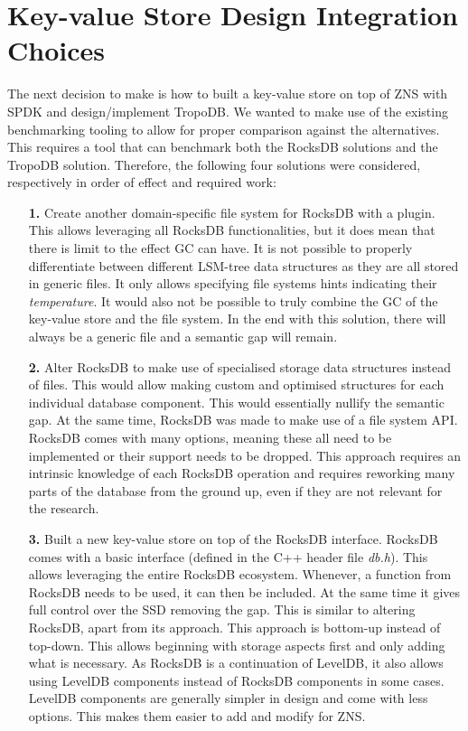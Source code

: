 \section{Key-value Store Design Integration Choices}
The next decision to make is how to built a key-value store on top of ZNS with SPDK and design/implement TropoDB. We wanted to make use of the existing benchmarking tooling to allow for proper comparison against the alternatives. This requires a tool that can benchmark both the RocksDB solutions and the TropoDB solution. Therefore, the following four solutions were considered, respectively in order of effect and required work:
\begin{enumerate}
    \item[\textbf{1.}] Create another domain-specific file system for RocksDB with a plugin. This allows leveraging all RocksDB functionalities, but it does mean that there is limit to the effect GC can have. It is not possible to properly differentiate between different LSM-tree data structures as they are all stored in generic files. It only allows specifying file systems hints indicating their \textit{temperature}. It would also not be possible to truly combine the GC of the key-value store and the file system. In the end with this solution, there will always be a generic file and a semantic gap will remain.  
    \item[\textbf{2.}] Alter RocksDB to make use of specialised storage data structures instead of files. This would allow making custom and optimised structures for each individual database component. This would essentially nullify the semantic gap. At the same time, RocksDB was made to make use of a file system API. RocksDB comes with many options, meaning these all need to be implemented or their support needs to be dropped. This approach requires an intrinsic knowledge of each RocksDB operation and requires reworking many parts of the database from the ground up, even if they are not relevant for the research.
    \item[\textbf{3.}] Built a new key-value store on top of the RocksDB interface. RocksDB comes with a basic interface (defined in the C++ header file \textit{db.h}). This allows leveraging the entire RocksDB ecosystem. Whenever, a function from RocksDB needs to be used, it can then be included. At the same time it gives full control over the SSD removing the gap. This is similar to altering RocksDB, apart from its approach. This approach is bottom-up instead of top-down. This allows beginning with storage aspects first and only adding what is necessary. As RocksDB is a continuation of LevelDB, it also allows using LevelDB components instead of RocksDB components in some cases. LevelDB components are generally simpler in design and come with less options. This makes them easier to add and modify for ZNS. 

\end{enumerate}
